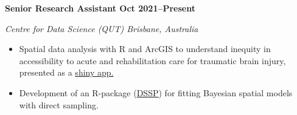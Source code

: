 \textbf{Senior Research Assistant \hfill Oct 2021--Present}\par
\textit{Centre for Data Science (QUT) \hfill Brisbane, Australia}\par

\begin{itemize}
	\item Spatial data analysis with R and ArcGIS to understand inequity in accessibility to acute and rehabilitation care for traumatic brain injury, presented as a \href{https://aushsi.shinyapps.io/itraqi_app/}{shiny app.}
	\item Development of an R-package (\href{https://github.com/gentrywhite/DSSP}{DSSP}) for fitting Bayesian spatial models with direct sampling.
\end{itemize}\par